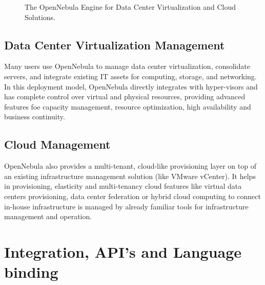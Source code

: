 \documentclass[9pt,twocolumn,twoside]{styles/osajnl}
\begin{document}
\begin{figure}[htbp]
	\centering
	\caption{The OpenNebula Engine for Data Center Virtualization and 
		Cloud Solutions.}
	\label{fig:false-color}
\end{figure}

\subsection{Data Center Virtualization Management}

Many users use OpenNebula to manage {data center 
virtualization}\cite{www-dcv-opennebula}, 
consolidate servers, and integrate existing IT assets for computing, 
storage, and networking. In this deployment model, OpenNebula 
directly integrates with hyper-visors and has complete control over 
virtual and physical resources, providing advanced features foe 
capacity management, resource optimization, high availability and 
business continuity.

\subsection{Cloud Management}

OpenNebula also provides a multi-tenant, cloud-like provisioning 
layer on top of an existing infrastructure management solution (like 
VMware vCenter). It helps in provisioning, elasticity and 
multi-tenancy cloud features like virtual data centers provisioning, 
data center federation or hybrid cloud computing to connect in-house 
infrastructure is managed by already familiar tools for 
infrastructure management and operation. 

\section{Integration, API's and Language binding}
\end{document}
